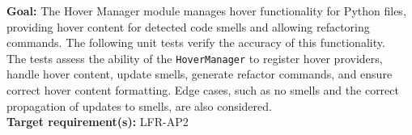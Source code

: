 \documentclass[12pt, titlepage]{article}
\begin{document}
  \textbf{Goal:} The Hover Manager module manages hover functionality
  for Python files, providing hover content for detected code smells
  and allowing refactoring commands. The following unit tests verify
  the accuracy of this functionality.\\

  \noindent The tests assess the ability of the \texttt{HoverManager}
  to register hover providers, handle hover content, update smells,
  generate refactor commands, and ensure correct hover content
  formatting. Edge cases, such as no smells and the correct
  propagation of updates to smells, are also considered.\\

  \noindent \textbf{Target requirement(s):} LFR-AP2~\cite{SRS} \\
\end{document}
